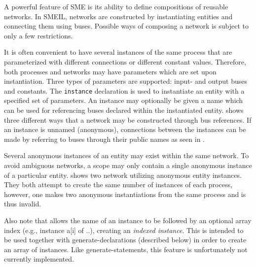 A powerful feature of SME is its ability to define compositions of reusable
networks. In SMEIL, networks are constructed by instantiating entities and
connecting them using buses. Possible ways of composing a network is subject to
only a few restrictions.

It is often convenient to have several instances of the same process that are
parameterized with different connections or different constant
values. Therefore, both processes and networks may have parameters which are set
upon instantiation. Three types of parameters are supported: input- and output
buses and constants. The {\tt instance} declaration is used to instantiate an
entity with a specified set of parameters. An instance may optionally be given a
name which can be used for referencing buses declared within the instantiated
entity.  shows three different ways that a network may be
constructed through bus references. If an instance is unnamed (anonymous),
connections between the instances can be made by referring to buses through
their public names as seen in .

Several anonymous instances of an entity may exist within the same network. To
avoid ambiguous networks, a scope may only contain a single anonymous instance
of a particular entity.   shows two network utilizing
anonymous entity instances. They both attempt to create the same number of
instances of each process, however, one makes two anonymous instantiations from
the same process and is thus invalid.

Also note that {\itshape <instance-name>} allows the name of an instance to be
followed by an optional array index (e.g., {\ttfamily instance a[i] of ..}),
creating an {\itshape indexed instance}. This is intended to be used together
with {\ttfamily generate}-declarations (described below) in order to create an
array of instances. Like {\ttfamily generate}-statements, this feature is
unfortunately not currently implemented.

